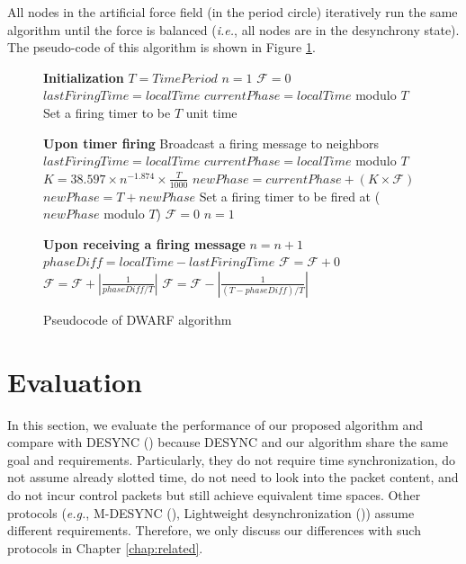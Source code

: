 All nodes in the artificial force field (in the period circle) iteratively run the same algorithm until the force is balanced (\textit{i.e.}, all nodes are in the desynchrony state).
The pseudo-code of this algorithm is shown in Figure \ref{fig:pseudocodedwarf}.

\begin{figure}[!t]
\begin{algorithmic}[1]
	\STATE \textbf{Initialization}  
  	\STATE $T = TimePeriod$ 
  	\STATE $n = 1$ 
  	\STATE $\mathcal{F} = 0$ 
  	\STATE $lastFiringTime = localTime$
  	\STATE $currentPhase = localTime$ modulo $T$
  	\STATE Set a firing timer to be $T$ unit time
  	\newline
  	
  	\STATE \textbf{Upon timer firing}
    \STATE Broadcast a firing message to neighbors
    \STATE $lastFiringTime = localTime$
  	\STATE $currentPhase= localTime$ modulo $T$
    \STATE $K = 38.597 \times n^{-1.874} \times \frac{T}{1000}$
    \STATE $newPhase = currentPhase + (K \times \mathcal{F})$
    	\STATE $newPhase = T + newPhase$
	\ENDIF
    \STATE Set a firing timer to be fired at ($newPhase$ modulo $T$)
   	\STATE $\mathcal{F} = 0$
   	\STATE $n = 1$
 	\newline
 	   
    \STATE \textbf{Upon receiving a firing message}
    \STATE $n = n + 1$
    \STATE $phaseDiff = localTime - lastFiringTime$
    	\STATE $\mathcal{F} = \mathcal{F} + 0$ 
    	\STATE $\mathcal{F} = \mathcal{F} + |\frac{1}{phaseDiff / T}|$  
   	\ELSE 
   		\STATE $\mathcal{F} = \mathcal{F} - |\frac{1}{(T - phaseDiff) / T}|$ 
    \ENDIF
\end{algorithmic}
\caption{Pseudocode of DWARF algorithm}
\label{fig:pseudocodedwarf}
\end{figure}

\section{Evaluation}
In this section, we evaluate the performance of our proposed algorithm and compare with DESYNC (\cite{4379660}) because DESYNC and our algorithm share the same goal and requirements. Particularly, they do not require time synchronization, do not assume already slotted time, do not need to look into the packet content, and do not incur control packets but still achieve equivalent time spaces. Other protocols (\textit{e.g.}, M-DESYNC (\cite{4274893}), Lightweight desynchronization (\cite{5062165})) assume different requirements. Therefore, we only discuss our differences with such protocols in Chapter \ref{chap:related}.

